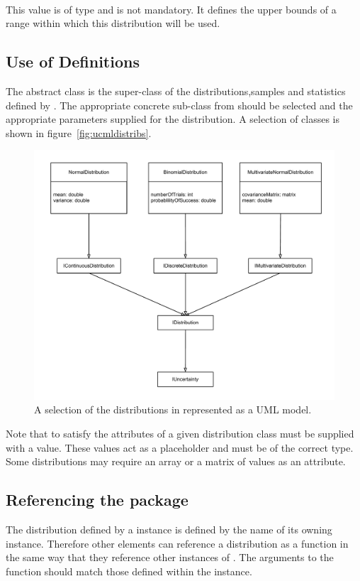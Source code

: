 \documentclass[draftspec]{sbmlpkgspec}
\begin{document}
\paragraph{}

This value is of type  and is not mandatory. It
defines the upper bounds of a range within which this distribution will
be used.

\subsection{Use of \uncertml Definitions}

The abstract class \unidistrib is the super-class of the
distributions,samples and statistics defined by \uncertml. The
appropriate concrete sub-class from \uncertml should be selected and
the appropriate parameters supplied for the distribution. A selection
of \uncertml classes is shown in figure~\vref{fig:ucmldistribs}.

\begin{figure}[htb]
\includegraphics[height=0.5\linewidth]{UncertMLDistributions.pdf}
\caption{A selection of the distributions in \uncertml represented as a UML model.}
\label{fig:ucmldistribs}
\end{figure}

Note \contraversial that to satisfy \uncertml the attributes of a given
distribution class must be supplied with a value. These values act as
a placeholder and must be of the correct type. Some \uncertml
distributions may require an array or a matrix of values as an
attribute.

\subsection{Referencing the \distrib package}

The distribution defined by a \Distribution instance is defined by the
name of its owning \FunctionDefinition instance. Therefore other \SBML
elements can reference a distribution as a function in the same way that they
reference other instances of \FunctionDefinition. The arguments to the function
should match those defined within the \Distribution instance.
\end{document}
